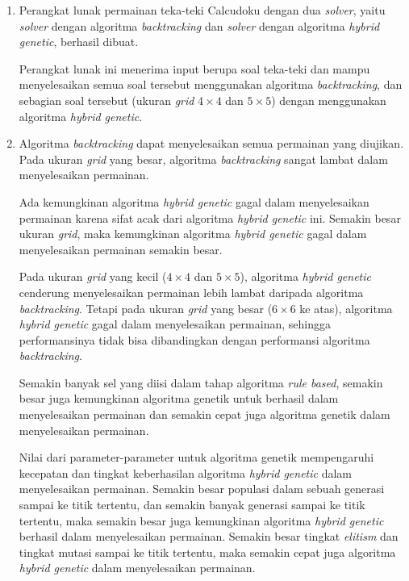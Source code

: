 \begin{enumerate}
\item Perangkat lunak permainan teka-teki Calcudoku dengan dua \textit{solver}, yaitu \textit{solver} dengan algoritma \textit{backtracking} dan \textit{solver} dengan algoritma \textit{hybrid genetic}, berhasil dibuat.

Perangkat lunak ini menerima input berupa soal teka-teki dan mampu menyelesaikan semua soal tersebut menggunakan algoritma \textit{backtracking}, dan sebagian soal tersebut (ukuran \textit{grid} \begin{math}4 \times 4\end{math} dan \begin{math}5 \times 5\end{math}) dengan menggunakan algoritma \textit{hybrid genetic}.

\item Algoritma \textit{backtracking} dapat menyelesaikan semua permainan yang diujikan. Pada ukuran \textit{grid} yang besar, algoritma \textit{backtracking} sangat lambat dalam menyelesaikan permainan.

Ada kemungkinan algoritma \textit{hybrid genetic} gagal dalam menyelesaikan permainan karena sifat acak dari algoritma \textit{hybrid genetic} ini. Semakin besar ukuran \textit{grid}, maka kemungkinan algoritma \textit{hybrid genetic} gagal dalam menyelesaikan permainan semakin besar.

Pada ukuran \textit{grid} yang kecil (\begin{math}4 \times 4\end{math} dan \begin{math}5 \times 5\end{math}), algoritma \textit{hybrid genetic} cenderung menyelesaikan permainan lebih lambat daripada algoritma \textit{backtracking}. Tetapi pada ukuran \textit{grid} yang besar (\begin{math}6 \times 6\end{math} ke atas), algoritma \textit{hybrid genetic} gagal dalam menyelesaikan permainan, sehingga performansinya tidak bisa dibandingkan dengan performansi algoritma \textit{backtracking}.

Semakin banyak sel yang diisi dalam tahap algoritma \textit{rule based}, semakin besar juga kemungkinan algoritma genetik untuk berhasil dalam menyelesaikan permainan dan semakin cepat juga algoritma genetik dalam menyelesaikan permainan.

Nilai dari parameter-parameter untuk algoritma genetik mempengaruhi kecepatan dan tingkat keberhasilan algoritma \textit{hybrid genetic} dalam menyelesaikan permainan. Semakin besar populasi dalam sebuah generasi sampai ke titik tertentu, dan semakin banyak generasi sampai ke titik tertentu, maka semakin besar juga kemungkinan algoritma \textit{hybrid genetic} berhasil dalam menyelesaikan permainan. Semakin besar tingkat \textit{elitism} dan tingkat mutasi sampai ke titik tertentu, maka semakin cepat juga algoritma \textit{hybrid genetic} dalam menyelesaikan permainan.
\end{enumerate}

